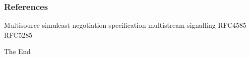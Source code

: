 \documentclass{beamer}
\begin{document}
\begin{frame}

\frametitle{References}
\footnotesize{
\begin{thebibliography}{99} %
%
 Multisource simulcast negotiation specification %
 multistream-signalling %
 RFC4585 %
 RFC5285 %
\end{thebibliography}
}
\end{frame}


\begin{frame}
\Huge{\centerline{The End}}
\end{frame}

\end{document}

